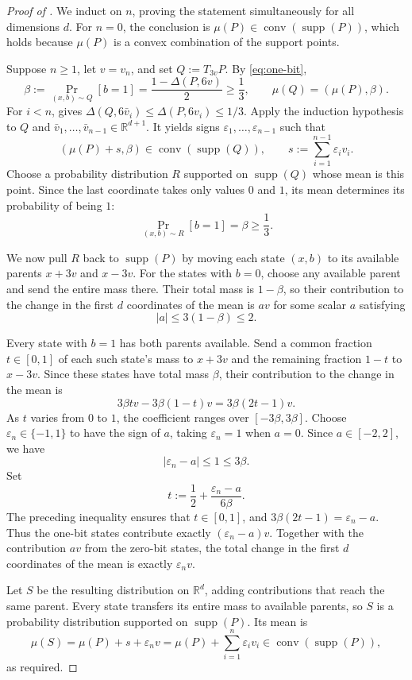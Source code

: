 \documentclass{article}
\newcommand{\R}{\mathbb{R}}
\newcommand{\eps}{\varepsilon}
\newcommand{\SDS}[2]{\Delta(#1,#2)}
\newcommand{\supp}{\operatorname{supp}}
\begin{document}
\begin{proof}[Proof of ]
We induct on $n$, proving the statement simultaneously for all
dimensions $d$. For $n=0$, the conclusion is
$\mu(P)\in\operatorname{conv}(\supp(P))$, which holds because
$\mu(P)$ is a convex combination of the support points.

Suppose $n\ge1$, let $v=v_n$, and set $Q:=T_{3v}P$.
By \eqref{eq:one-bit},
\[
\beta:=\Pr_{(x,b)\sim Q}[b=1]
=\frac{1-\SDS{P}{6v}}2\ge\frac13,
\qquad
\mu(Q)=(\mu(P),\beta).
\]
For $i<n$,  gives
$\SDS{Q}{6\bar v_i}\le\SDS{P}{6v_i}\le1/3$.
Apply the induction hypothesis to $Q$ and
$\bar v_1,\ldots,\bar v_{n-1}\in\R^{d+1}$.
It yields signs $\eps_1,\ldots,\eps_{n-1}$ such that
\[
(\mu(P)+s,\beta)\in\operatorname{conv}(\supp(Q)),
\qquad
s:=\sum_{i=1}^{n-1}\eps_i v_i.
\]
Choose a probability distribution $R$ supported on $\supp(Q)$
whose mean is this point. Since the last coordinate takes only
values $0$ and $1$, its mean determines its probability of being $1$:
\[
\Pr_{(x,b)\sim R}[b=1]=\beta\ge\frac13.
\]

We now pull $R$ back to $\supp(P)$ by moving each state $(x,b)$
to its available parents $x+3v$ and $x-3v$. For the states with
$b=0$, choose any available parent and send the entire mass there.
Their total mass is $1-\beta$, so their contribution to the change
in the first $d$ coordinates of the mean is $av$ for some scalar
$a$ satisfying
\[
|a|\le3(1-\beta)\le2.
\]

Every state with $b=1$ has both parents available. Send a common
fraction $t\in[0,1]$ of each such state's mass to $x+3v$ and
the remaining fraction $1-t$ to $x-3v$. Since these states have
total mass $\beta$, their contribution to the change in the mean is
\[
3\beta t v-3\beta(1-t)v=3\beta(2t-1)v.
\]
As $t$ varies from $0$ to $1$, the coefficient ranges over
$[-3\beta,3\beta]$.
Choose $\eps_n\in\{-1,1\}$ to have the sign of $a$, taking
$\eps_n=1$ when $a=0$. Since $a\in[-2,2]$, we have
\[
|\eps_n-a|\le1\le3\beta.
\]
Set
\[
t:=\frac12+\frac{\eps_n-a}{6\beta}.
\]
The preceding inequality ensures that $t\in[0,1]$, and
$3\beta(2t-1)=\eps_n-a$. Thus the one-bit states contribute
exactly $(\eps_n-a)v$. Together with the contribution $av$ from the
zero-bit states, the total change in the first $d$ coordinates
of the mean is exactly $\eps_n v$.

Let $S$ be the resulting distribution on $\R^d$, adding
contributions that reach the same parent. Every state transfers
its entire mass to available parents, so $S$ is a
probability distribution supported on $\supp(P)$. Its mean is
\[
\mu(S)
=\mu(P)+s+\eps_n v
=\mu(P)+\sum_{i=1}^n\eps_i v_i
\in\operatorname{conv}(\supp(P)),
\]
as required.
\end{proof}
\end{document}
